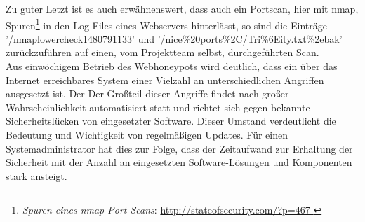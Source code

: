 Zu guter Letzt ist es auch erwähnenswert, dass auch ein Portscan, hier mit nmap, Spuren\footnote{ \textit{Spuren eines nmap Port-Scans}: \url{http://stateofsecurity.com/?p=467 }} in den Log-Files eines Webservers hinterlässt, so sind die Einträge '/nmaplowercheck1480791133' und '/nice\%20ports\%2C/Tri\%6Eity.txt\%2ebak' zurückzuführen auf einen, vom Projektteam selbst, durchgeführten Scan.\\

Aus einwöchigem Betrieb des Webhoneypots wird deutlich, dass ein über das Internet erreichbares System einer Vielzahl an unterschiedlichen Angriffen ausgesetzt ist. Der Der Großteil dieser Angriffe findet nach großer Wahrscheinlichkeit automatisiert statt und richtet sich gegen bekannte Sicherheitslücken von eingesetzter Software. Dieser Umstand verdeutlicht die Bedeutung und Wichtigkeit von regelmäßigen Updates. Für einen Systemadministrator hat dies zur Folge, dass der Zeitaufwand zur Erhaltung der Sicherheit mit der Anzahl an eingesetzten Software-Lösungen und Komponenten stark ansteigt.